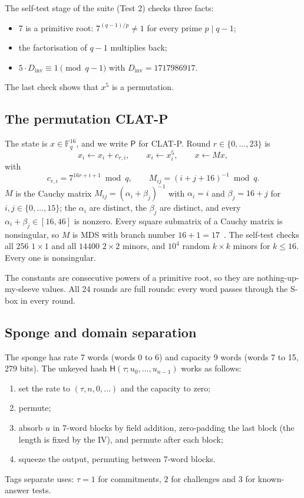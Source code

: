 \documentclass[10pt,a4paper]{article}
\newcommand{\Fq}{\mathbb{F}_q}
\newcommand{\perm}{\mathsf{P}}
\newcommand{\Hash}{\mathsf{H}}
\theoremstyle{definition}
\theoremstyle{remark}
\begin{document}
The self-test stage of the suite (Test 2) checks three facts:
\begin{itemize}
  \item 7 is a primitive root: $7^{(q-1)/p} \neq 1$ for every prime $p \mid q-1$;
  \item the factorisation of $q-1$ multiplies back;
  \item $5 \cdot D_{\mathrm{inv}} \equiv 1 \pmod{q-1}$ with $D_{\mathrm{inv}} = 1717986917$.
\end{itemize}
The last check shows that $x^5$ is a permutation.

\subsection{The permutation CLAT-P}
The state is $x \in \Fq^{16}$, and we write $\perm$ for CLAT-P. Round $r \in \{0,\dots,23\}$ is
\[
  x_i \leftarrow x_i + c_{r,i},\qquad x_i \leftarrow x_i^5,\qquad x \leftarrow M x,
\]
with
\[
  c_{r,i} = 7^{16r + i + 1} \bmod q, \qquad M_{ij} = (i + j + 16)^{-1} \bmod q .
\]
$M$ is the Cauchy matrix $M_{ij} = (\alpha_i + \beta_j)^{-1}$ with $\alpha_i = i$ and $\beta_j = 16 + j$ for $i, j \in \{0,\dots,15\}$; the $\alpha_i$ are distinct, the $\beta_j$ are distinct, and every $\alpha_i + \beta_j \in [16, 46]$ is nonzero. Every square submatrix of a Cauchy matrix is nonsingular, so $M$ is MDS with branch number $16+1 = 17$~\cite{ymt97}. The self-test checks all $256$ $1\times1$ and all $14400$ $2\times2$ minors, and $10^4$ random $k\times k$ minors for $k \le 16$. Every one is nonsingular.

The constants are consecutive powers of a primitive root, so they are nothing-up-my-sleeve values. All 24 rounds are full rounds: every word passes through the S-box in every round.

\subsection{Sponge and domain separation}
The sponge has rate 7 words (words 0 to 6) and capacity 9 words (words 7 to 15, 279 bits). The unkeyed hash $\Hash(\tau; u_0,\dots,u_{n-1})$ works as follows:
\begin{enumerate}
  \item set the rate to $(\tau, n, 0, \dots)$ and the capacity to zero;
  \item permute;
  \item absorb $u$ in 7-word blocks by field addition, zero-padding the last block (the length is fixed by the IV), and permute after each block;
  \item squeeze the output, permuting between 7-word blocks.
\end{enumerate}
Tags separate uses: $\tau = 1$ for commitments, $2$ for challenges and $3$ for known-answer tests.
\end{document}
